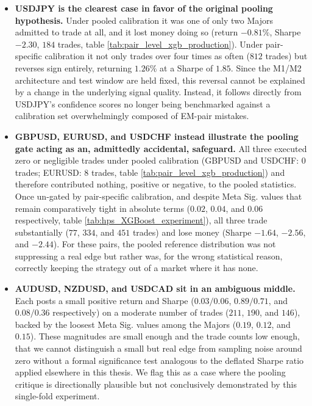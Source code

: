 \documentclass[12pt, a4paper]{article}
\begin{document}
\begin{itemize}
\item \textbf{USDJPY is the clearest case in favor of the original pooling hypothesis.} Under pooled calibration it was one of only two Majors admitted to trade at 
all, and it lost money doing so (return $-0.81\%$, Sharpe $-2.30$, $184$ trades, table \ref{tab:pair_level_xgb_production}). Under pair-specific calibration it not 
only trades over four times as often ($812$ trades) but reverses sign entirely, returning $1.26\%$ at a Sharpe of $1.85$. Since the M1/M2 architecture and test window 
are held fixed, this reversal cannot be explained by a change in the underlying signal quality. Instead, it follows directly from USDJPY's confidence scores no longer being 
benchmarked against a calibration set overwhelmingly composed of EM-pair mistakes.

\item \textbf{GBPUSD, EURUSD, and USDCHF instead illustrate the pooling gate acting as an, admittedly accidental, safeguard.} All three executed zero or negligible 
trades under pooled calibration (GBPUSD and USDCHF: $0$ trades; EURUSD: $8$ trades, table \ref{tab:pair_level_xgb_production}) and therefore contributed nothing, 
positive or negative, to the pooled statistics. Once un-gated by pair-specific calibration, and despite Meta Sig. values that remain comparatively tight in absolute 
terms ($0.02$, $0.04$, and $0.06$ respectively, table \ref{tab:hps_XGBoost_experiment}), all three trade substantially ($77$, $334$, and $451$ trades) and lose money 
(Sharpe $-1.64$, $-2.56$, and $-2.44$). For these pairs, the pooled reference distribution was not suppressing a real edge but rather was, for the wrong statistical reason, 
correctly keeping the strategy out of a market where it has none.

\item \textbf{AUDUSD, NZDUSD, and USDCAD sit in an ambiguous middle.} Each posts a small positive return and Sharpe ($0.03/0.06$, $0.89/0.71$, and $0.08/0.36$ 
respectively) on a moderate number of trades ($211$, $190$, and $146$), backed by the loosest Meta Sig. values among the Majors ($0.19$, $0.12$, and $0.15$). These 
magnitudes are small enough and the trade counts low enough, that we cannot distinguish a small but real edge from sampling noise around zero without a formal 
significance test analogous to the deflated Sharpe ratio applied elsewhere in this thesis. We flag this as a case where the pooling critique is directionally 
plausible but not conclusively demonstrated by this single-fold experiment.


\end{itemize}
\end{document}
